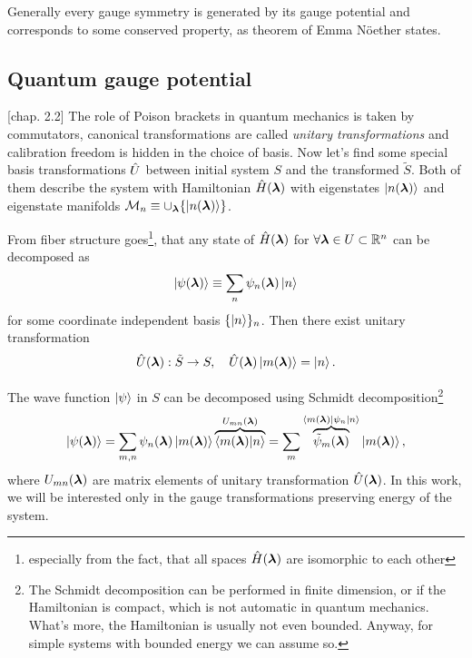 Generally every gauge symmetry is generated by its gauge potential and corresponds to some conserved property, as theorem of Emma Nöether states.



\subsection{Quantum gauge potential}
\citep{kolodrubez}[chap. 2.2]
The role of Poison brackets in quantum mechanics is taken by commutators, canonical transformations are called \emph{unitary transformations} and calibration freedom is hidden in the choice of basis. Now let's find some special basis transformations $\hat{U}$ between initial system $S$ and the transformed $\tilde{S}$. Both of them describe the system with Hamiltonian $\hat{H}({\bm\lambda})$ with eigenstates $\ket{n({\bm\lambda})}$ and eigenstate manifolds $\mathcal{M}_n\equiv \cup_{\bm\lambda} \{\ket{n({\bm\lambda})}\}$. 

From fiber structure goes\footnote{especially from the fact, that all spaces $\hat{H}({\bm\lambda})$ are isomorphic to each other}, that any state of $\hat{H}({\bm\lambda})$ for $\forall {\bm\lambda}\in U\subset \mathbb{R}^n$ can be decomposed as
    \begin{equation}
    \ket{\psi({\bm\lambda})}\equiv \sum_n \psi_n({\bm\lambda})\ket{n}
\end{equation}    
for some coordinate independent basis $\{\ket{n}\}_n$.
Then there exist unitary transformation
\begin{equation}
    \hat{U}({\bm\lambda}): \tilde S\rightarrow S,\quad \hat{U}({\bm\lambda})\ket{m({\bm\lambda})}=\ket{n}.
    \label{eq:transformationU}
\end{equation}


The wave function $\ket{\psi}$ in $S$ can be decomposed using Schmidt decomposition\footnote{The Schmidt decomposition can be performed in finite dimension, or if the Hamiltonian is compact, which is not automatic in quantum mechanics. What's more, the Hamiltonian is usually not even bounded. Anyway, for simple systems with bounded energy we can assume so.}
\begin{equation}
    \ket{\psi({\bm\lambda})} = \sum_{m,n}\psi_n({\bm\lambda}) \ket{m({\bm\lambda})}\overbrace{\braket{m({\bm\lambda})|n}}^{U_{mn}({\bm\lambda})} =\sum_m \overbrace{\tilde{\psi}_m({\bm\lambda})}^{\braket{m({\bm\lambda})|\psi_n|n}}\ket{m({\bm\lambda})},
\end{equation}
where $U_{mn}({\bm\lambda})$ are matrix elements of unitary transformation $\hat{U}({\bm\lambda})$. In this work, we will be interested only in the gauge transformations preserving energy of the system.


